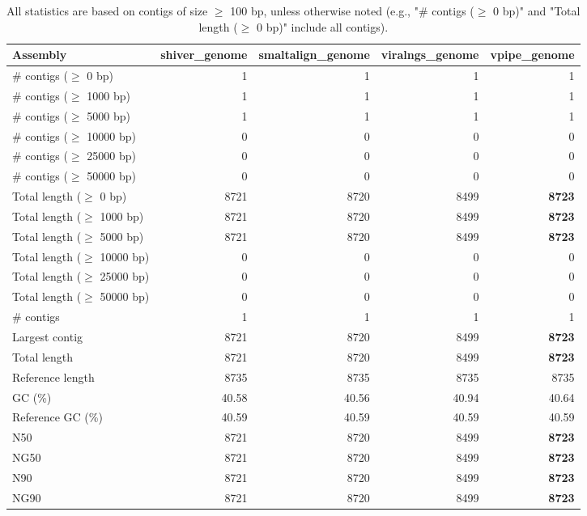 \documentclass[12pt,a4paper]{article}
\begin{document}
\begin{table}[ht]
\begin{center}
\caption{All statistics are based on contigs of size $\geq$ 100 bp, unless otherwise noted (e.g., "\# contigs ($\geq$ 0 bp)" and "Total length ($\geq$ 0 bp)" include all contigs).}
\begin{tabular}{|l*{4}{|r}|}
\hline
Assembly & shiver\_genome & smaltalign\_genome & viralngs\_genome & vpipe\_genome \\ \hline
\# contigs ($\geq$ 0 bp) & 1 & 1 & 1 & 1 \\ \hline
\# contigs ($\geq$ 1000 bp) & 1 & 1 & 1 & 1 \\ \hline
\# contigs ($\geq$ 5000 bp) & 1 & 1 & 1 & 1 \\ \hline
\# contigs ($\geq$ 10000 bp) & 0 & 0 & 0 & 0 \\ \hline
\# contigs ($\geq$ 25000 bp) & 0 & 0 & 0 & 0 \\ \hline
\# contigs ($\geq$ 50000 bp) & 0 & 0 & 0 & 0 \\ \hline
Total length ($\geq$ 0 bp) & 8721 & 8720 & 8499 & {\bf 8723} \\ \hline
Total length ($\geq$ 1000 bp) & 8721 & 8720 & 8499 & {\bf 8723} \\ \hline
Total length ($\geq$ 5000 bp) & 8721 & 8720 & 8499 & {\bf 8723} \\ \hline
Total length ($\geq$ 10000 bp) & 0 & 0 & 0 & 0 \\ \hline
Total length ($\geq$ 25000 bp) & 0 & 0 & 0 & 0 \\ \hline
Total length ($\geq$ 50000 bp) & 0 & 0 & 0 & 0 \\ \hline
\# contigs & 1 & 1 & 1 & 1 \\ \hline
Largest contig & 8721 & 8720 & 8499 & {\bf 8723} \\ \hline
Total length & 8721 & 8720 & 8499 & {\bf 8723} \\ \hline
Reference length & 8735 & 8735 & 8735 & 8735 \\ \hline
GC (\%) & 40.58 & 40.56 & 40.94 & 40.64 \\ \hline
Reference GC (\%) & 40.59 & 40.59 & 40.59 & 40.59 \\ \hline
N50 & 8721 & 8720 & 8499 & {\bf 8723} \\ \hline
NG50 & 8721 & 8720 & 8499 & {\bf 8723} \\ \hline
N90 & 8721 & 8720 & 8499 & {\bf 8723} \\ \hline
NG90 & 8721 & 8720 & 8499 & {\bf 8723} \\ \hline

\end{tabular}
\end{center}
\end{table}
\end{document}

